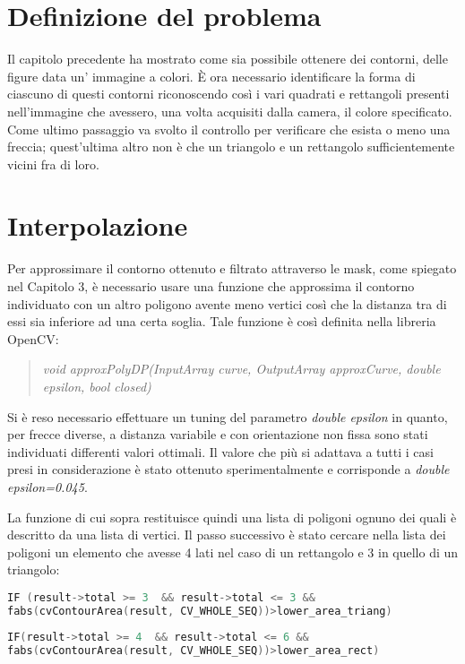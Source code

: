 \section{Definizione del problema}
Il capitolo precedente ha mostrato come sia possibile ottenere dei contorni, delle figure data un' immagine a colori.
È ora necessario identificare la forma di ciascuno di questi contorni riconoscendo così i vari quadrati e rettangoli presenti nell'immagine che avessero, una volta acquisiti dalla camera, il colore specificato. Come ultimo passaggio va svolto il controllo per verificare che esista o meno una freccia; quest'ultima altro non è che un triangolo e un rettangolo sufficientemente vicini fra di loro.

\section{Interpolazione}
Per approssimare il contorno ottenuto e filtrato attraverso le mask, come spiegato nel Capitolo 3, è necessario usare una funzione che approssima il contorno individuato con un altro poligono avente meno vertici così che la distanza tra di essi sia inferiore ad una certa soglia. Tale funzione è così definita nella libreria OpenCV:

\begin{quotation}
	\textsl{void approxPolyDP(InputArray curve, OutputArray approxCurve, double epsilon, bool closed)}
\end{quotation}

Si è reso necessario effettuare un tuning del parametro \textsl{double epsilon} in quanto, per frecce diverse, a distanza variabile e con orientazione non fissa sono stati individuati differenti valori ottimali. Il valore che più si adattava a tutti i casi presi in considerazione è stato ottenuto sperimentalmente e corrisponde a \textsl{double epsilon=0.045}.

La funzione di cui sopra restituisce quindi una lista di poligoni ognuno dei quali è descritto da una lista di vertici.
Il passo successivo è stato cercare nella lista dei poligoni un elemento che avesse 4 lati nel caso di un rettangolo e 3 in quello di un triangolo:

\begin{lstlisting}[language=c]
IF (result->total >= 3  && result->total <= 3 && 
fabs(cvContourArea(result, CV_WHOLE_SEQ))>lower_area_triang)
\end{lstlisting}
\begin{lstlisting}[language=c]
IF(result->total >= 4  && result->total <= 6 && 
fabs(cvContourArea(result, CV_WHOLE_SEQ))>lower_area_rect)
\end{lstlisting}

